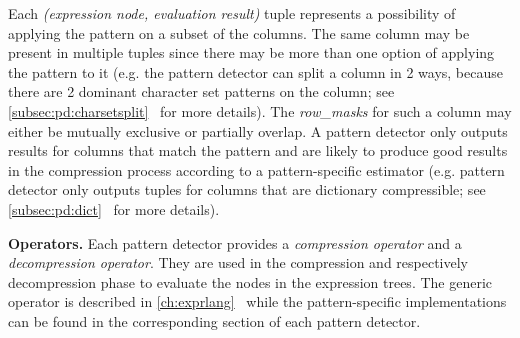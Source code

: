 Each \textit{(expression node, evaluation result)} tuple represents a possibility of applying the pattern on a subset of the columns. The same column may be present in multiple tuples since there may be more than one option of applying the pattern to it (e.g. the  pattern detector can split a column in 2 ways, because there are 2 dominant character set patterns on the column; see \ref{subsec:pd:charsetsplit}~ for more details). The \textit{row\_masks} for such a column may either be mutually exclusive or partially overlap. A pattern detector only outputs results for columns that match the pattern and are likely to produce good results in the compression process according to a pattern-specific estimator (e.g.  pattern detector only outputs tuples for columns that are dictionary compressible; see \ref{subsec:pd:dict}~ for more details).

\textbf{Operators.} Each pattern detector provides a \textit{compression operator} and a \textit{decompression operator}. They are used in the compression and respectively decompression phase to evaluate the nodes in the expression trees. The generic operator is described in \ref{ch:exprlang}~ while the pattern-specific implementations can be found in the corresponding section of each pattern detector.



